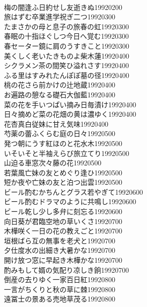 \begin{multicols}{2}
\\梅の闇逢ふ日約せし友逝きぬ\hfill{19920200}
\\旅はずむ卒業進学祝ぎ二つ\hfill{19920300}
\\たまさかの母と息子の旅春の虹\hfill{19920300}
\\春眠の十指ほぐしつ今日へ覚む\hfill{19920300}
\\春セーター鏡に肩のうすきこと\hfill{19920300}
\\美くしく老いたきものよ柴木蓮\hfill{19920400}
\\シクラメン茶の間笑ひ溢れさす\hfill{19920400}
\\ふる里はすみれたんぽぽ墓の径\hfill{19920400}
\\桃の花さら前かけの辻地蔵\hfill{19920400}
\\お遍路の憩なる礎石大伽藍\hfill{19920400}
\\菜の花を手いつぱい摘み日毎漬け\hfill{19920400}
\\日々摘めど菜の花畑の黄は濃ゆく\hfill{19920400}
\\花杏真白従妹に甘え気味\hfill{19920400}
\\芍薬の蕾ふくらむ庭の日々\hfill{19920500}
\\発つ朝にうす紅ほのと花水木\hfill{19920500}
\\いそいそと半袖えらび旅立てり\hfill{19920500}
\\山迫る車窓次々藤の花\hfill{19920500}
\\若葉風亡妹の友とめぐり逢ひ\hfill{19920500}
\\短か夜や亡妹の友と泊つ出雲\hfill{19920500}
\\ビール酌むかちんとグラス若やぎて\hfill{19920600}
\\ビール酌むドラマのように共鳴し\hfill{19920600}
\\ビール乾し少し多弁に刻忘る\hfill{19920600}
\\向日葵が君臨空地の草いくさ\hfill{19920700}
\\木樺咲く一日の花の教えごと\hfill{19920700}
\\垣根ばら互の無事を老犬と\hfill{19920700}
\\夕仕度水の出細き大暑かな\hfill{19920700}
\\開け放つ窓に早起き木樺かな\hfill{19920700}
\\酌みもして婿の気配り凉しき餉\hfill{19920700}
\\倒産の去りゆく一家百日紅\hfill{19920800}
\\一言がちくりと秋の草に棘\hfill{19920800}
\\遠冨士の景ある売地草茂る\hfill{19920800}

\end{multicols}
